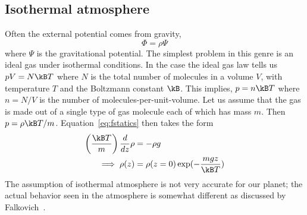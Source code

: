 \documentclass{tufte-book} %
\begin{document}
\subsection{Isothermal atmosphere}
Often the external potential comes from gravity, 
\begin{equation}
\Phi = \rho\Psi
\end{equation}
where $\Psi$ is the gravitational potential. 
The simplest problem in this genre is an ideal gas under isothermal
conditions. In the case the ideal gas law tells us $pV = N\kB T$
where $N$ is the total number of molecules in a volume $V$, with
temperature $T$ and the Boltzmann constant $\kB$. This implies,
$p=n\kB T $ where $n=N/V$ is the number of molecules-per-unit-volume. 
Let us assume that the gas is made out of a single type of gas
molecule each of which has mass $m$. Then 
$p=\rho\kB T/m $. Equation~\ref{eq:fstatics} then takes the form
\begin{subequations}
\begin{align}
\left(\frac{\kB T}{m}\right)\frac{d}{dz} \rho &= -\rho g  \\
\implies \rho(z) &= \rho(z=0)\exp(-\frac{mgz}{\kB T})
\end{align}
\end{subequations}
The assumption of isothermal atmosphere is not very accurate for our
planet; the actual behavior seen in the atmosphere is somewhat
different as discussed by Falkovich~\cite{Falkovich2018fluid}.
\end{document}
